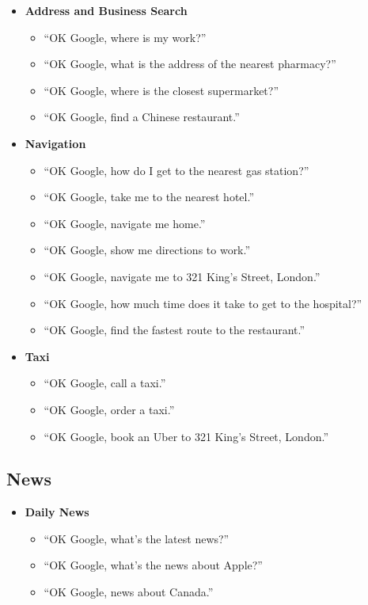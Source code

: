 \documentclass[
  jou,
  floatsintext,
  longtable,
  a4paper,
  nolmodern,
  notxfonts,
  notimes,
  colorlinks=true,linkcolor=blue,citecolor=blue,urlcolor=blue]{apa7}
\providecommand{\tightlist}{%
  \setlength{\itemsep}{0pt}\setlength{\parskip}{0pt}}
\begin{document}
\begin{itemize}
\tightlist
\item
  \textbf{Address and Business Search}

  \begin{itemize}
  \tightlist
  \item
    ``OK Google, where is my work?''
  \item
    ``OK Google, what is the address of the nearest pharmacy?''
  \item
    ``OK Google, where is the closest supermarket?''
  \item
    ``OK Google, find a Chinese restaurant.''
  \end{itemize}
\item
  \textbf{Navigation}

  \begin{itemize}
  \tightlist
  \item
    ``OK Google, how do I get to the nearest gas station?''
  \item
    ``OK Google, take me to the nearest hotel.''
  \item
    ``OK Google, navigate me home.''
  \item
    ``OK Google, show me directions to work.''
  \item
    ``OK Google, navigate me to 321 King's Street, London.''
  \item
    ``OK Google, how much time does it take to get to the hospital?''
  \item
    ``OK Google, find the fastest route to the restaurant.''
  \end{itemize}
\item
  \textbf{Taxi}

  \begin{itemize}
  \tightlist
  \item
    ``OK Google, call a taxi.''
  \item
    ``OK Google, order a taxi.''
  \item
    ``OK Google, book an Uber to 321 King's Street, London.''
  \end{itemize}
\end{itemize}

\subsection{News}\label{news}

\begin{itemize}
\tightlist
\item
  \textbf{Daily News}

  \begin{itemize}
  \tightlist
  \item
    ``OK Google, what's the latest news?''
  \item
    ``OK Google, what's the news about Apple?''
  \item
    ``OK Google, news about Canada.''
  \end{itemize}
\end{itemize}
\end{document}
